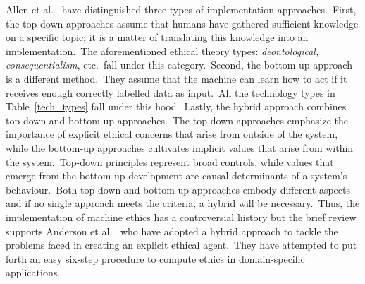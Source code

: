 Allen et al.\ \cite{Allen2005-ALLAMT} have distinguished three types of implementation approaches.\ First, the top-down approaches assume that humans have gathered sufficient knowledge on a specific topic; it is a matter of translating this knowledge into an implementation.\ The aforementioned ethical theory types: \textit{deontological, consequentialism}, etc.\ fall under this category.\ Second, the bottom-up approach is a different method.\ They assume that the machine can learn how to act if it receives enough correctly labelled data as input.\ All the technology types in Table~\ref{tech_types} fall under this hood.\ Lastly, the hybrid approach combines top-down and bottom-up approaches.\ The top-down approaches emphasize the importance of explicit ethical concerns that arise from outside of the system, while the bottom-up approaches cultivates implicit values that arise from within the system.\ Top-down principles represent broad controls, while values that emerge from the bottom-up development are causal determinants of a system’s behaviour.\ Both top-down and bottom-up approaches embody different aspects and if no single approach meets the criteria, a hybrid will be necessary.\ Thus, the implementation of machine ethics has a controversial history but the brief review supports Anderson et al.\ \cite{Anderson_Anderson_2007} who have adopted a hybrid approach to tackle the problems faced in creating an explicit ethical agent.\ They have attempted to put forth an easy six-step procedure to compute ethics in domain-specific applications.
